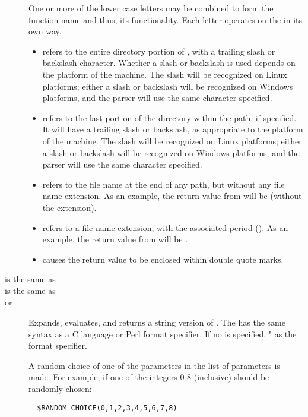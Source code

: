 \begin{description}
\item []
One or more of the lower case letters may be combined to form the
function name and thus, its functionality.
Each letter operates on the  in its own way.
\begin{itemize}
  \item {} refers to the entire directory portion of ,
with a trailing slash or backslash character.
Whether a slash or backslash is used depends on the platform of
the machine.
The slash will be recognized on Linux platforms;
either a slash or backslash will be recognized on Windows platforms,
and the parser will use the same character specified.
  \item {} refers to the last portion of the directory within the path,
if specified.
It will have a trailing slash or backslash, 
as appropriate to the platform of the machine.
The slash will be recognized on Linux platforms;
either a slash or backslash will be recognized on Windows platforms,
and the parser will use the same character specified.
  \item {} refers to the file name at the end of any path,
but without any file name extension.
As an  example, the return value from 
will be  (without the  extension).
  \item {} refers to a file name extension, with the associated
period ().
As an  example, the return value from 
will be .
  \item {} causes the return value to be enclosed within double
quote marks.
\end{itemize}

\item [ is the same as ]

\item [ is the same as ]

\item [
       or ]
Expands, evaluates, and returns a string version of 
.
The  has the same syntax as
a C language or Perl format specifier.
If no  is specified, \verb@"%d"@ is used
as the format specifier.

\item []
A random choice of one of the parameters in the list of parameters is made.
For example,
if one of the integers 0-8 (inclusive) should be randomly
chosen:
\begin{verbatim}
  $RANDOM_CHOICE(0,1,2,3,4,5,6,7,8)
\end{verbatim}


\end{description}
